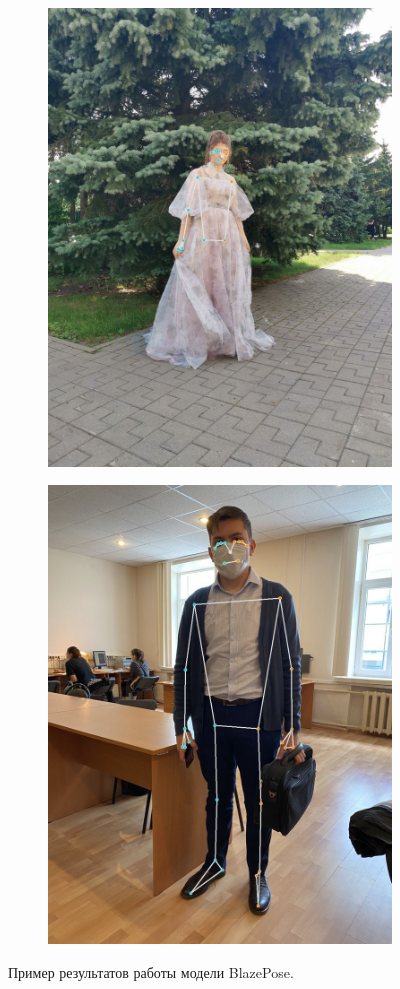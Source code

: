 \begin{figure}[h]
\begin{subfigure}[b]{.5\textwidth}
    \includegraphics[height=\textwidth]{./images/MPPose/36}
    \caption{ }
\end{subfigure}
\begin{subfigure}[b]{.5\textwidth}
	\centering
    \includegraphics[height=\textwidth]{./images/MPPose/33}
    \caption{ }
\end{subfigure}
    \caption{Пример результатов работы модели BlazePose.}
    \label{fig:MP_result}
\end{figure}

